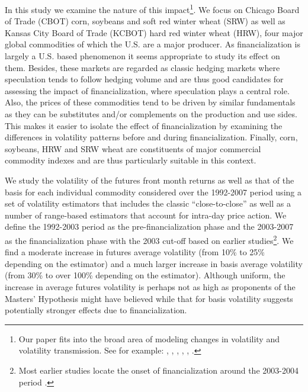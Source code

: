 \documentclass[12pt,]{article}
\let\rmarkdownfootnote\footnote%
\def\footnote{\protect\rmarkdownfootnote}
\begin{document}
In this study we examine the nature of this impact\footnote{Our paper
  fits into the broad area of modeling changes in volatility and
  volatility transmission. See for example:
  \citet{gannon_simultaneous_2010}, \citet{jiang_volatility_2017},
  \citet{li_when_2016}, \citet{fung_information_2003},
  \citet{smith_forecasting_2003}, \citet{nishina_nonlinear_2012}.}. We
focus on Chicago Board of Trade (CBOT) corn, soybeans and soft red
winter wheat (SRW) as well as Kansas City Board of Trade (KCBOT) hard
red winter wheat (HRW), four major global commodities of which the U.S.
are a major producer. As financialization is largely a U.S. based
phenomenon it seems appropriate to study its effect on them. Besides,
these markets are regarded as classic hedging markets where speculation
tends to follow hedging volume \citep[\citet{working_whose_1954},
\citet{working_speculation_1960}, \citet{working_new_1962},
\citet{sanders_marginal_2012}]{working_hedging_1953} and are thus good
candidates for assessing the impact of financialization, where
speculation plays a central role. Also, the prices of these commodities
tend to be driven by similar fundamentals as they can be substitutes
and/or complements on the production and use sides. This makes it easier
to isolate the effect of financialization by examining the differences
in volatility patterns before and during financialization. Finally,
corn, soybeans, HRW and SRW wheat are constituents of major commercial
commodity indexes and are thus particularly suitable in this context.

We study the volatility of the futures front month returns as well as
that of the basis for each individual commodity considered over the
1992-2007 period using a set of volatility estimators that includes the
classic ``close-to-close'' as well as a number of range-based estimators
that account for intra-day price action. We define the 1992-2003 period
as the pre-financialization phase and the 2003-2007 as the
financialization phase with the 2003 cut-off based on earlier
studies\footnote{Most earlier studies locate the onset of
  financialization around the 2003-2004 period
  \citep[\citet{cheng_financialization_2014},
  \citet{hamilton_effects_2015}, \citet{irwin_index_2011},
  \citet{irwin_financialization_2012}, \citet{irwin_testing_2012},
  \citet{tang_index_2012}]{basak_model_2016}.}. We find a moderate
increase in futures average volatility (from 10\% to 25\% depending on
the estimator) and a much larger increase in basis average volatility
(from 30\% to over 100\% depending on the estimator). Although uniform,
the increase in average futures volatility is perhaps not as high as
proponents of the Masters' Hypothesis might have believed while that for
basis volatility suggests potentially stronger effects due to
financialization.
\end{document}
